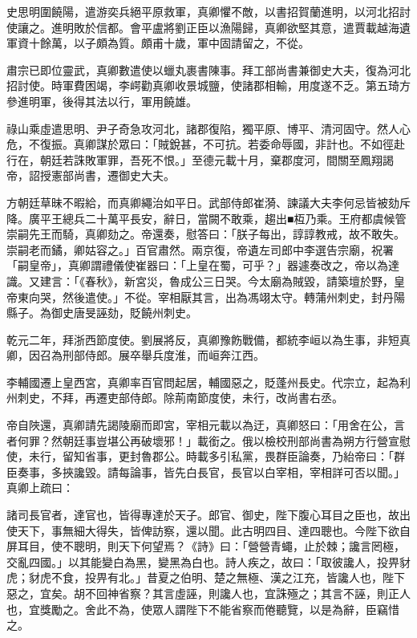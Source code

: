 \begin{pinyinscope}
 史思明圍饒陽，遣游奕兵絕平原救軍，真卿懼不敵，以書招賀蘭進明，以河北招討使讓之。進明敗於信都。會平盧將劉正臣以漁陽歸，真卿欲堅其意，遣賈載越海遺軍資十餘萬，以子頗為質。頗甫十歲，軍中固請留之，不從。



 肅宗已即位靈武，真卿數遣使以蠟丸裹書陳事。拜工部尚書兼御史大夫，復為河北招討使。時軍費困竭，李崿勸真卿收景城鹽，使諸郡相輸，用度遂不乏。第五琦方參進明軍，後得其法以行，軍用饒雄。



 祿山乘虛遣思明、尹子奇急攻河北，諸郡復陷，獨平原、博平、清河固守。然人心危，不復振。真卿謀於眾曰：「賊銳甚，不可抗。若委命辱國，非計也。不如徑赴行在，朝廷若誅敗軍罪，吾死不恨。」至德元載十月，棄郡度河，間關至鳳翔謁帝，詔授憲部尚書，遷御史大夫。



 方朝廷草昧不暇給，而真卿繩治如平日。武部侍郎崔漪、諫議大夫李何忌皆被劾斥降。廣平王總兵二十萬平長安，辭日，當闕不敢乘，趨出■枑乃乘。王府都虞候管崇嗣先王而騎，真卿劾之。帝還奏，慰答曰：「朕子每出，諄諄教戒，故不敢失。崇嗣老而鐍，卿姑容之。」百官肅然。兩京復，帝遺左司郎中李選告宗廟，祝署「嗣皇帝」，真卿謂禮儀使崔器曰：「上皇在蜀，可乎？」器遽奏改之，帝以為達識。又建言：「《春秋》，新宮災，魯成公三日哭。今太廟為賊毀，請築壇於野，皇帝東向哭，然後遣使。」不從。宰相厭其言，出為馮翊太守。轉蒲州刺史，封丹陽縣子。為御史唐旻誣劾，貶饒州刺史。



 乾元二年，拜浙西節度使。劉展將反，真卿豫飭戰備，都統李峘以為生事，非短真卿，因召為刑部侍郎。展卒舉兵度淮，而峘奔江西。



 李輔國遷上皇西宮，真卿率百官問起居，輔國惡之，貶蓬州長史。代宗立，起為利州刺史，不拜，再遷吏部侍郎。除荊南節度使，未行，改尚書右丞。



 帝自陜還，真卿請先謁陵廟而即宮，宰相元載以為迂，真卿怒曰：「用舍在公，言者何罪？然朝廷事豈堪公再破壞邪！」載銜之。俄以檢校刑部尚書為朔方行營宣慰使，未行，留知省事，更封魯郡公。時載多引私黨，畏群臣論奏，乃紿帝曰：「群臣奏事，多挾讒毀。請每論事，皆先白長官，長官以白宰相，宰相詳可否以聞。」真卿上疏曰：



 諸司長官者，達官也，皆得專達於天子。郎官、御史，陛下腹心耳目之臣也，故出使天下，事無細大得失，皆俾訪察，還以聞。此古明四目、達四聰也。今陛下欲自屏耳目，使不聰明，則天下何望焉？《詩》曰：「營營青蠅，止於棘；讒言罔極，交亂四國。」以其能變白為黑，變黑為白也。詩人疾之，故曰：「取彼讒人，投畀豺虎；豺虎不食，投畀有北。」昔夏之伯明、楚之無極、漢之江充，皆讒人也，陛下惡之，宜矣。胡不回神省察？其言虛誣，則讒人也，宜誅殛之；其言不誣，則正人也，宜獎勵之。舍此不為，使眾人謂陛下不能省察而倦聽覽，以是為辭，臣竊惜之。




\end{pinyinscope}
